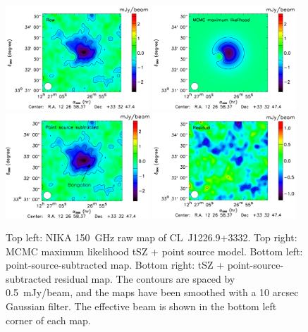 \documentclass[twocolumn,traditabstract]{aa}
\begin{document}
	\begin{figure}[h]
	\centering
	\includegraphics[width=0.48\textwidth]{Figure/MCMC_raw_map.pdf}
	\includegraphics[width=0.48\textwidth]{Figure/MCMC_best_fit.pdf}
	\includegraphics[width=0.48\textwidth]{Figure/MCMC_point_source_removed_Carsten_version.pdf}
	\includegraphics[width=0.48\textwidth]{Figure/MCMC_residual.pdf}
	\caption{Top left: NIKA 150~GHz raw map of \mbox{CL~J1226.9+3332}. Top right: MCMC maximum likelihood tSZ + point source model. Bottom left: point-source-subtracted map. Bottom right: tSZ + point-source-subtracted residual map. The contours are spaced by 0.5~mJy/beam, and the maps have been smoothed with a 10 arcsec Gaussian filter. The effective beam is shown in the bottom left corner of each map.}
        \label{fig:best_fit_map}
	\end{figure}
\end{document}
